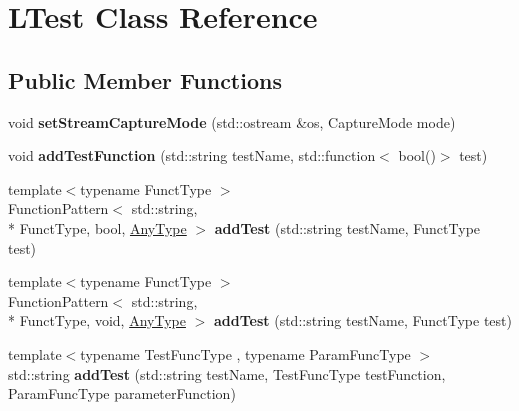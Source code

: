 \hypertarget{class_l_test}{\section{L\-Test Class Reference}
\label{class_l_test}
}
\subsection*{Public Member Functions}
\begin{DoxyCompactItemize}
\item 
\hypertarget{class_l_test_a53dae3665b2d922658f8d20f1f79b92f}{void {\bfseries set\-Stream\-Capture\-Mode} (std\-::ostream \&os, Capture\-Mode mode)}\label{class_l_test_a53dae3665b2d922658f8d20f1f79b92f}

\item 
\hypertarget{class_l_test_a7843839e657ca12b5906cd2425b6a5f0}{void {\bfseries add\-Test\-Function} (std\-::string test\-Name, std\-::function$<$ bool()$>$ test)}\label{class_l_test_a7843839e657ca12b5906cd2425b6a5f0}

\item 
\hypertarget{class_l_test_ac181620b51ef86e3ef28843f8cce200a}{{\footnotesize template$<$typename Funct\-Type $>$ }\\Function\-Pattern$<$ std\-::string, \\*
Funct\-Type, bool, \hyperlink{struct_l_test_source_1_1_any_type}{Any\-Type} $>$ {\bfseries add\-Test} (std\-::string test\-Name, Funct\-Type test)}\label{class_l_test_ac181620b51ef86e3ef28843f8cce200a}

\item 
\hypertarget{class_l_test_a2b42aebc4994bae68c16f6f8ee7ff049}{{\footnotesize template$<$typename Funct\-Type $>$ }\\Function\-Pattern$<$ std\-::string, \\*
Funct\-Type, void, \hyperlink{struct_l_test_source_1_1_any_type}{Any\-Type} $>$ {\bfseries add\-Test} (std\-::string test\-Name, Funct\-Type test)}\label{class_l_test_a2b42aebc4994bae68c16f6f8ee7ff049}

\item 
\hypertarget{class_l_test_a349e34bd51c6b9ac4b49f2b5f8a0c119}{{\footnotesize template$<$typename Test\-Func\-Type , typename Param\-Func\-Type $>$ }\\std\-::string {\bfseries add\-Test} (std\-::string test\-Name, Test\-Func\-Type test\-Function, Param\-Func\-Type parameter\-Function)}\label{class_l_test_a349e34bd51c6b9ac4b49f2b5f8a0c119}


\end{DoxyCompactItemize}

